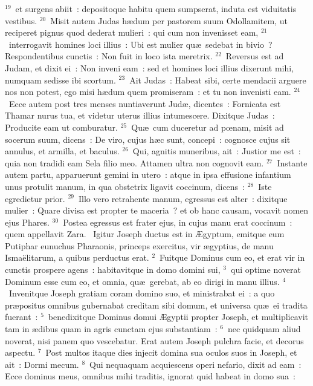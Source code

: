 ${}^{19}$~et surgens abiit~: depositoque habitu quem sumpserat, induta est viduitatis vestibus.
${}^{20}$~Misit autem Judas h\ae dum per pastorem suum Odollamitem, ut reciperet pignus quod dederat mulieri~: qui cum non invenisset eam,
${}^{21}$~interrogavit homines loci illius~: Ubi est mulier qu\ae\ sedebat in bivio~? Respondentibus cunctis~: Non fuit in loco ista meretrix.
${}^{22}$~Reversus est ad Judam, et dixit ei~: Non inveni eam~: sed et homines loci illius dixerunt mihi, numquam sedisse ibi scortum.
${}^{23}$~Ait Judas~: Habeat sibi, certe mendacii arguere nos non potest, ego misi h\ae dum quem promiseram~: et tu non invenisti eam.
${}^{24}$~Ecce autem post tres menses nuntiaverunt Jud\ae , dicentes~: Fornicata est Thamar nurus tua, et videtur uterus illius intumescere. Dixitque Judas~: Producite eam ut comburatur.
${}^{25}$~Qu\ae\ cum duceretur ad pœnam, misit ad socerum suum, dicens~: De viro, cujus h\ae c sunt, concepi~: cognosce cujus sit annulus, et armilla, et baculus.
${}^{26}$~Qui, agnitis muneribus, ait~: Justior me est~: quia non tradidi eam Sela filio meo. Attamen ultra non cognovit eam.
${}^{27}$~Instante autem partu, apparuerunt gemini in utero~: atque in ipsa effusione infantium unus protulit manum, in qua obstetrix ligavit coccinum, dicens~:
${}^{28}$~Iste egredietur prior.
${}^{29}$~Illo vero retrahente manum, egressus est alter~: dixitque mulier~: Quare divisa est propter te maceria~? et ob hanc causam, vocavit nomen ejus Phares.
${}^{30}$~Postea egressus est frater ejus, in cujus manu erat coccinum~: quem appellavit Zara.
~Igitur Joseph ductus est in \AE gyptum, emitque eum Putiphar eunuchus Pharaonis, princeps exercitus, vir \ae gyptius, de manu Isma\"elitarum, a quibus perductus erat.
${}^{2}$~Fuitque Dominus cum eo, et erat vir in cunctis prospere agens~: habitavitque in domo domini sui,
${}^{3}$~qui optime noverat Dominum esse cum eo, et omnia, qu\ae\ gerebat, ab eo dirigi in manu illius.
${}^{4}$~Invenitque Joseph gratiam coram domino suo, et ministrabat ei~: a quo pr\ae positus omnibus gubernabat creditam sibi domum, et universa qu\ae\ ei tradita fuerant~:
${}^{5}$~benedixitque Dominus domui \AE gyptii propter Joseph, et multiplicavit tam in \ae dibus quam in agris cunctam ejus substantiam~:
${}^{6}$~nec quidquam aliud noverat, nisi panem quo vescebatur. Erat autem Joseph pulchra facie, et decorus aspectu.
${}^{7}$~Post multos itaque dies injecit domina sua oculos suos in Joseph, et ait~: Dormi mecum.
${}^{8}$~Qui nequaquam acquiescens operi nefario, dixit ad eam~: Ecce dominus meus, omnibus mihi traditis, ignorat quid habeat in domo sua~:
